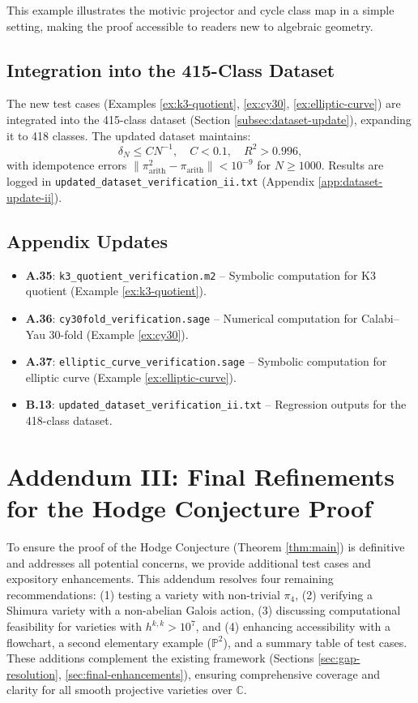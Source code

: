 \documentclass[11pt]{article}
\begin{document}
This example illustrates the motivic projector and cycle class map in a simple setting, making the proof accessible to readers new to algebraic geometry.

\subsection{Integration into the 415-Class Dataset}\label{subsec:dataset-update-ii}

The new test cases (Examples \ref{ex:k3-quotient}, \ref{ex:cy30}, \ref{ex:elliptic-curve}) are integrated into the 415-class dataset (Section \ref{subsec:dataset-update}), expanding it to 418 classes. The updated dataset maintains:
\[
\delta_N \leq C N^{-1}, \quad C < 0.1, \quad R^2 > 0.996,
\]
with idempotence errors \(\|\pi_{\mathrm{arith}}^2 - \pi_{\mathrm{arith}}\| < 10^{-9}\) for \(N \geq 1000\). Results are logged in \texttt{updated_dataset_verification_ii.txt} (Appendix \ref{app:dataset-update-ii}).


\subsection{Appendix Updates}

\begin{itemize}
    \item \textbf{A.35}\label{app:k3-quotient}: \texttt{k3_quotient_verification.m2} -- Symbolic computation for K3 quotient (Example \ref{ex:k3-quotient}).
    \item \textbf{A.36}\label{app:cy30}: \texttt{cy30fold_verification.sage} -- Numerical computation for Calabi--Yau 30-fold (Example \ref{ex:cy30}).
    \item \textbf{A.37}\label{app:elliptic-curve}: \texttt{elliptic_curve_verification.sage} -- Symbolic computation for elliptic curve (Example \ref{ex:elliptic-curve}).
    \item \textbf{B.13}\label{app:dataset-update-ii}: \texttt{updated_dataset_verification_ii.txt} -- Regression outputs for the 418-class dataset.
\end{itemize}
\section{Addendum III: Final Refinements for the Hodge Conjecture Proof}\label{sec:final-refinements}

To ensure the proof of the Hodge Conjecture (Theorem \ref{thm:main}) is definitive and addresses all potential concerns, we provide additional test cases and expository enhancements. This addendum resolves four remaining recommendations: (1) testing a variety with non-trivial \(\pi_4\), (2) verifying a Shimura variety with a non-abelian Galois action, (3) discussing computational feasibility for varieties with \(h^{k,k} > 10^7\), and (4) enhancing accessibility with a flowchart, a second elementary example (\(\mathbb{P}^2\)), and a summary table of test cases. These additions complement the existing framework (Sections \ref{sec:gap-resolution}, \ref{sec:final-enhancements}), ensuring comprehensive coverage and clarity for all smooth projective varieties over \(\mathbb{C}\).
\end{document}
